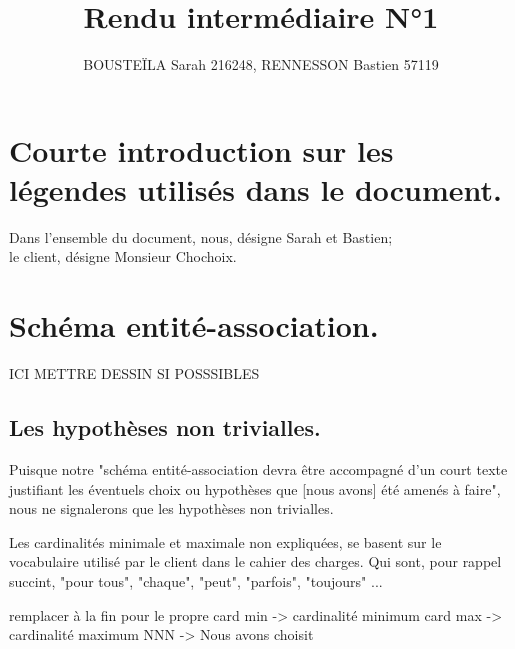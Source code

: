 \documentclass[12pt,a4paper]{article}
\begin{document}

\title{Rendu intermédiaire N°1}%
\author{BOUSTEÏLA Sarah 216248, RENNESSON Bastien 57119}%
\maketitle




\section{Courte introduction sur les légendes utilisés dans le document.}
Dans l'ensemble du document, nous, désigne Sarah et Bastien; \\
le client, désigne Monsieur Chochoix.


\section{Schéma entité-association.}

ICI METTRE DESSIN SI POSSSIBLES




\subsection{Les hypothèses non trivialles.}
Puisque notre "schéma entité-association devra être accompagné d’un court texte justifiant les éventuels choix ou hypothèses que [nous avons] été amenés à faire", nous ne signalerons que les hypothèses non trivialles.

Les cardinalités minimale et maximale non expliquées, se basent sur le vocabulaire utilisé par le client dans le cahier des charges. Qui sont, pour rappel succint, "pour tous", "chaque", "peut", "parfois", "toujours" ... 



remplacer à la fin pour le propre
card min -> cardinalité minimum
card max -> cardinalité maximum
NNN -> Nous avons choisit 
\end{document}
